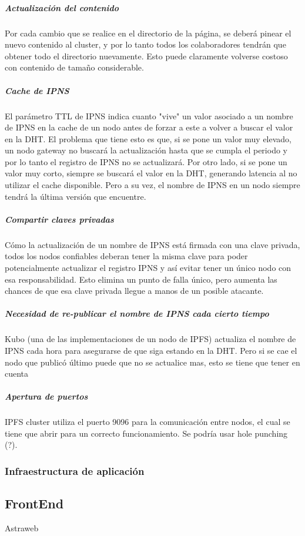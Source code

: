 \subparagraph{Actualización del contenido} Por cada cambio que se realice en el directorio de la página, se deberá pinear el nuevo contenido al cluster, y por lo tanto todos los colaboradores tendrán que obtener todo el directorio nuevamente. Esto puede claramente volverse costoso con contenido de tamaño considerable.
    
\subparagraph{Cache de IPNS} El parámetro TTL de IPNS indica cuanto "vive" un valor asociado a un nombre de IPNS en la cache de un nodo antes de forzar a este a volver a buscar el valor en la DHT. El problema que tiene esto es que, si se pone un valor muy elevado, un nodo gateway no buscará la actualización hasta que se cumpla el periodo y por lo tanto el registro de IPNS no se actualizará. Por otro lado, si se pone un valor muy corto, siempre se buscará el valor en la DHT, generando latencia al no utilizar el cache disponible. Pero a su vez, el nombre de IPNS en un nodo siempre tendrá la última versión que encuentre.

\subparagraph{Compartir claves privadas} Cómo la actualización de un nombre de IPNS está firmada con una clave privada, todos los nodos confiables deberan tener la misma clave para poder potencialmente actualizar el registro IPNS y así evitar tener un único nodo con esa responsabilidad. Esto elimina un punto de falla único, pero aumenta las chances de que esa clave privada llegue a manos de un posible atacante.

\subparagraph{Necesidad de re-publicar el nombre de IPNS cada cierto tiempo} Kubo (una de las implementaciones de un nodo de IPFS) actualiza el nombre de IPNS cada hora para asegurarse de que siga estando en la DHT. Pero si se cae el nodo que publicó último puede que no se actualice mas, esto se tiene que tener en cuenta

\subparagraph{Apertura de puertos} IPFS cluster utiliza el puerto 9096 para la comunicación entre nodos, el cual se tiene que abrir para un correcto funcionamiento. Se podría usar hole punching (?).

\subsubsection{Infraestructura de aplicación}



\subsection{FrontEnd}

Astraweb
